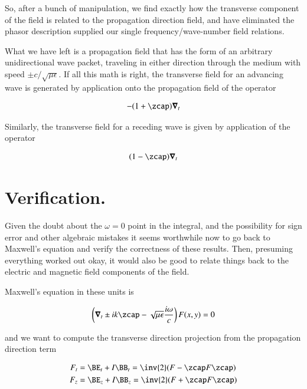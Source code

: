 So, after a bunch of manipulation, we find exactly how the transverse component of the field is related to the propagation direction field, and have eliminated the phasor description supplied our single frequency/wave-number field relations.

What we have left is a propagation field that has the form of an arbitrary unidirectional wave packet, traveling in either direction through the medium with speed $\pm c/\sqrt{\mu\epsilon}$.  If all this math is right, the transverse field for an advancing wave is generated by application onto the propagation field of the operator

\begin{align}\label{eqn:waveguideRetardedAdvanced:fooX}
-(1 + \zcap) \spacegrad_t
\end{align}

Similarly, the transverse field for a receding wave is given by application of the operator

\begin{align}\label{eqn:waveguideRetardedAdvanced:fooY}
(1 - \zcap) \spacegrad_t
\end{align}

\section{Verification.}

Given the doubt about the $\omega =0$ point in the integral, and the possibility for sign error and other algebraic mistakes it seems worthwhile now to go back to Maxwell's equation and verify the correctness of these results.  Then, presuming everything worked out okay, it would also be good to relate things back to the electric and magnetic field components of the field.

Maxwell's equation in these units is

\begin{align}\label{eqn:waveguideRetardedAdvanced:summaryMax2}
\left(\spacegrad_t \pm i k \zcap - \sqrt{\mu\epsilon}\frac{i\omega}{c}\right) F(x,y) = 0
\end{align}

and we want to compute the transverse direction projection from the propagation direction term

\begin{align}\label{eqn:waveguideRetardedAdvanced:foo5}
F_t &= \BE_t + I \BB_t = \inv{2} (F - \zcap F \zcap) \\
F_z &= \BE_z + I \BB_z = \inv{2} (F + \zcap F \zcap) 
\end{align}

